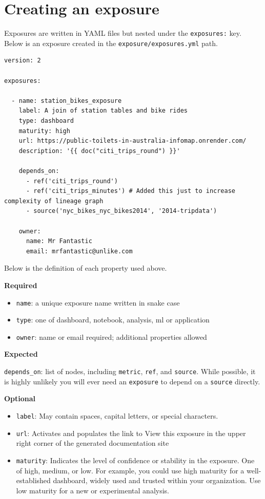\documentclass[
]{book}
\begin{document}
\hypertarget{creating-an-exposure}{%
\section{Creating an exposure}\label{creating-an-exposure}}

Exposures are written in YAML files but nested under the \texttt{exposures:} key. Below is an exposure created in the \texttt{exposure/exposures.yml} path.

\begin{verbatim}
version: 2

exposures:

  - name: station_bikes_exposure
    label: A join of station tables and bike rides
    type: dashboard
    maturity: high
    url: https://public-toilets-in-australia-infomap.onrender.com/
    description: '{{ doc("citi_trips_round") }}'

    depends_on:
      - ref('citi_trips_round')
      - ref('citi_trips_minutes') # Added this just to increase complexity of lineage graph
      - source('nyc_bikes_nyc_bikes2014', '2014-tripdata')

    owner:
      name: Mr Fantastic
      email: mrfantastic@unlike.com
\end{verbatim}

Below is the definition of each property used above.

\textbf{Required}

\begin{itemize}
\item
  \texttt{name}: a unique exposure name written in snake case
\item
  \texttt{type}: one of dashboard, notebook, analysis, ml or application
\item
  \texttt{owner}: name or email required; additional properties allowed
\end{itemize}

\textbf{Expected}

\texttt{depends\_on}: list of nodes, including \texttt{metric}, \texttt{ref}, and \texttt{source}. While possible, it is highly unlikely you will ever need an \texttt{exposure} to depend on a \texttt{source} directly.

\textbf{Optional}

\begin{itemize}
\item
  \texttt{label}: May contain spaces, capital letters, or special characters.
\item
  \texttt{url}: Activates and populates the link to View this exposure in the upper right corner of the generated documentation site
\item
  \texttt{maturity}: Indicates the level of confidence or stability in the exposure. One of high, medium, or low. For example, you could use high maturity for a well-established dashboard, widely used and trusted within your organization. Use low maturity for a new or experimental analysis.
\end{itemize}
\end{document}
